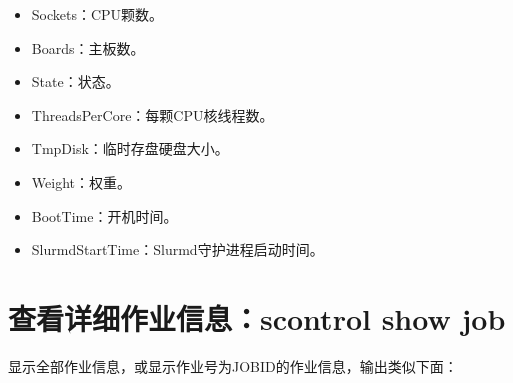 \documentclass[a4paper,12pt,english]{sphinxmanual}
\begin{document}
\begin{itemize}
\item {} 
\sphinxAtStartPar
Sockets：CPU颗数。

\item {} 
\sphinxAtStartPar
Boards：主板数。

\item {} 
\sphinxAtStartPar
State：状态。

\item {} 
\sphinxAtStartPar
ThreadsPerCore：每颗CPU核线程数。

\item {} 
\sphinxAtStartPar
TmpDisk：临时存盘硬盘大小。

\item {} 
\sphinxAtStartPar
Weight：权重。

\item {} 
\sphinxAtStartPar
BootTime：开机时间。

\item {} 
\sphinxAtStartPar
SlurmdStartTime：Slurmd守护进程启动时间。

\end{itemize}


\section{查看详细作业信息：scontrol show job}
\label{\detokenize{slurm/slurm:scontrol-show-job}}
\sphinxAtStartPar
{}显示全部作业信息，或显示作业号为JOBID的作业信息，输出类似下面：
\end{document}
